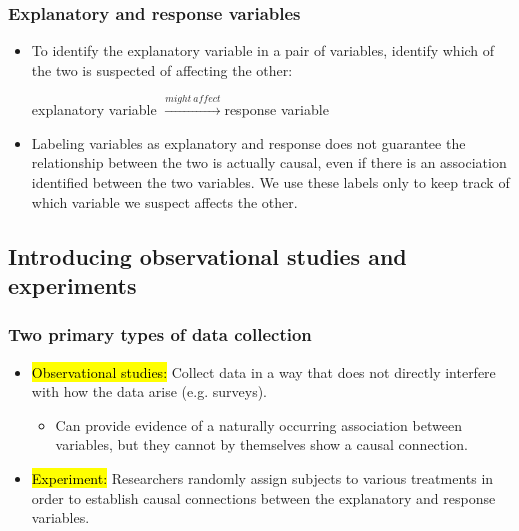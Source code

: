 \begin{frame}
\frametitle{Explanatory and response variables}

\begin{itemize}

\item To identify the explanatory variable in a pair of variables, identify which of the two is suspected of affecting the other:

\begin{center}
explanatory variable $\xrightarrow{might~affect}$response variable
\end{center}

\item Labeling variables as explanatory and response does not guarantee the relationship between the two is actually causal, even if there is an association identified between the two variables. We use these labels only to keep track of which variable we suspect affects the other.

\end{itemize}

\end{frame}


\subsection{Introducing observational studies and experiments}


\begin{frame}
\frametitle{Two primary types of data collection}

\begin{itemize}

\item \hl{Observational studies:} Collect data in a way that does not directly interfere with how the data arise (e.g. surveys).
\begin{itemize}
\item Can provide evidence of a naturally occurring association between variables, but they cannot by themselves show a causal connection.
\end{itemize}

\pause

\item \hl{Experiment:} Researchers randomly assign subjects to various treatments in order to establish causal connections between the explanatory and response variables.


\end{itemize}

\end{frame}

